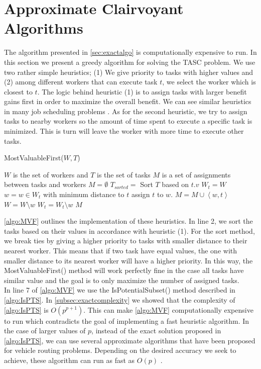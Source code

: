 \section{Approximate Clairvoyant Algorithms}
\label{sec:approxalgo}

The algorithm presented in \cref{sec:exactalgo} is computationally expensive to run. In this section we present a greedy algorithm for solving the TASC problem. We use two rather simple heuristics; (1) We give priority to tasks with higher values and (2) among different workers that can execute task $t$, we select the worker which is closest to $t$. The logic behind heuristic (1) is to assign tasks with larger benefit gains first in order to maximize the overall benefit. We can see similar heuristics in many job scheduling problems \cite{Kolen07}. As for the second heuristic, we try to assign tasks to nearby workers so the amount of time spent to execute a specific task is minimized. This is turn will leave the worker with more time to execute other tasks.

\begin{algorithm}[h]
\caption{MostValuableFirst($W, T$)}
\label{algo:MVF}
\begin{algorithmic}[1]
\REQUIRE $W$ is the set of workers and $T$ is the set of tasks
\ENSURE $M$ is a set of assignments between tasks and workers
\STATE $M = \emptyset$
\STATE $T_{sorted} = $ Sort $T$ based on $t.v$
	\STATE $W_t = W$
		\STATE $w = w \in W_t$ with minimum distance to $t$
			\STATE assign $t$ to $w$.
			\STATE $M = M \cup \left\langle w, t \right\rangle$
				\STATE $W = W \setminus w$
			\ENDIF
		\ELSE
			\STATE $W_t = W_t \setminus w$
		\ENDIF
	\ENDWHILE
\ENDWHILE
\RETURN $M$
\end{algorithmic}
\end{algorithm}

\cref{algo:MVF} outlines the implementation of these heuristics. In line 2, we sort the tasks based on their values in accordance with heuristic (1). For the sort method, we break ties by giving a higher priority to tasks with smaller distance to their nearest worker. This means that if two task have equal values, the one with smaller distance to its nearest worker will have a higher priority. In this way, the MostValuableFirst() method will work perfectly fine in the case all tasks have similar value and the goal is to only maximize the number of assigned tasks.\\

In line 7 of \cref{algo:MVF} we use the IsPotentialSubset() method described in \cref{algo:IsPTS}. In \cref{subsec:exactcomplexity} we showed that the complexity of \cref{algo:IsPTS} is $O(p^{p+1})$. This can make \cref{algo:MVF} computationally expensive to run which contradicts the goal of implementing a fast heuristic algorithm. In the case of larger values of $p$, instead of the exact solution proposed in \cref{algo:IsPTS}, we can use several approximate algorithms that have been proposed for vehicle routing problems. Depending on the desired accuracy we seek to achieve, these algorithm can run as fast as $O(p)$ \cite{Laporte00}.
